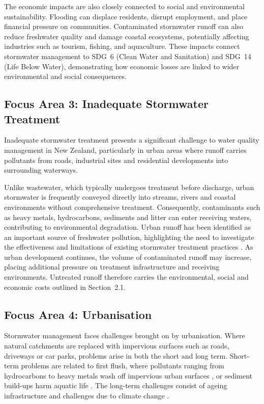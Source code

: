 \documentclass[11pt,a4paper]{article}
\begin{document}
The economic impacts are also closely connected to social and environmental sustainability. Flooding can displace residents, disrupt employment, and place financial pressure on communities. Contaminated stormwater runoff can also reduce freshwater quality and damage coastal ecosystems, potentially affecting industries such as tourism, fishing, and aquaculture. These impacts connect stormwater management to SDG~6 (Clean Water and Sanitation) and SDG~14 (Life Below Water), demonstrating how economic losses are linked to wider environmental and social consequences.

\subsection{Focus Area 3: Inadequate Stormwater Treatment}

Inadequate stormwater treatment presents a significant challenge to water quality management in New Zealand, particularly in urban areas where runoff carries pollutants from roads, industrial sites and residential developments into surrounding waterways.

Unlike wastewater, which typically undergoes treatment before discharge, urban stormwater is frequently conveyed directly into streams, rivers and coastal environments without comprehensive treatment. Consequently, contaminants such as heavy metals, hydrocarbons, sediments and litter can enter receiving waters, contributing to environmental degradation. Urban runoff has been identified as an important source of freshwater pollution, highlighting the need to investigate the effectiveness and limitations of existing stormwater treatment practices \citep{mfe2020_issue2,healy2010}. As urban development continues, the volume of contaminated runoff may increase, placing additional pressure on treatment infrastructure and receiving environments. Untreated runoff therefore carries the environmental, social and economic costs outlined in Section~2.1.

\subsection{Focus Area 4: Urbanisation}

Stormwater management faces challenges brought on by urbanisation. Where natural catchments are replaced with impervious surfaces such as roads, driveways or car parks, problems arise in both the short and long term. Short-term problems are related to first flush, where pollutants ranging from hydrocarbons to heavy metals wash off impervious urban surfaces \citep{waternz}, or sediment build-ups harm aquatic life \citep{shepherds2022}. The long-term challenges consist of ageing infrastructure \citep{akl_homeowner2026} and challenges due to climate change \citep{esnz_climate}.
\end{document}
